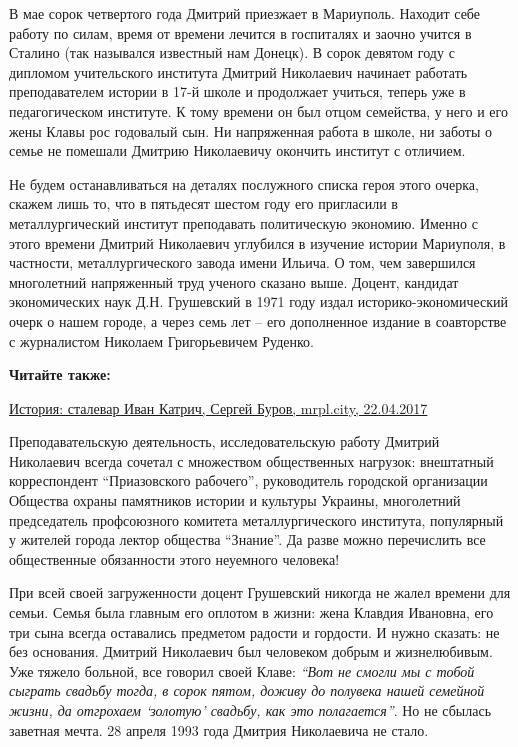 В мае сорок четвертого года Дмитрий приезжает в Мариуполь. Находит себе работу
по силам, время от времени лечится в госпиталях и заочно учится в Сталино (так
назывался известный нам Донецк). В сорок девятом году с дипломом учительского
института Дмитрий Николаевич начинает работать преподавателем истории в 17-й
школе и продолжает учиться, теперь уже в педагогическом институте. К тому
времени он был отцом семейства, у него и его жены Клавы рос годовалый сын. Ни
напряженная работа в школе, ни заботы о семье не помешали Дмитрию Николаевичу
окончить институт с отличием.

Не будем останавливаться на деталях послужного списка героя этого очерка,
скажем лишь то, что в пятьдесят шестом году его пригласили в металлургический
институт преподавать политическую экономию. Именно с этого времени Дмитрий
Николаевич углубился в изучение истории Мариуполя, в частности,
металлургического завода имени Ильича. О том, чем завершился многолетний
напряженный труд ученого сказано выше. Доцент, кандидат экономических наук Д.Н.
Грушевский в 1971 году издал историко-экономический очерк о нашем городе, а
через семь лет – его дополненное издание в соавторстве с журналистом Николаем
Григорьевичем Руденко.

\textbf{Читайте также:} 

\href{https://archive.org/details/22_04_2017.sergij_burov.mrpl_city.istoria_stalevar_ivan_katrich}{%
История: сталевар Иван Катрич, Сергей Буров, mrpl.city, 22.04.2017}

Преподавательскую деятельность, исследовательскую работу Дмитрий Николаевич
всегда сочетал с множеством общественных нагрузок: внештатный корреспондент
\enquote{Приазовского рабочего}, руководитель городской организации Общества охраны
памятников истории и культуры Украины, многолетний председатель профсоюзного
комитета металлургического института, популярный у жителей города лектор
общества \enquote{Знание}. Да разве можно перечислить все общественные обязанности
этого неуемного человека!

При всей своей загруженности доцент Грушевский никогда не жалел времени для
семьи. Семья была главным его оплотом в жизни: жена Клавдия Ивановна, его три
сына всегда оставались предметом радости и гордости. И нужно сказать: не без
основания. Дмитрий Николаевич был человеком добрым и жизнелюбивым. Уже тяжело
больной, все говорил своей Клаве: \emph{\enquote{Вот не смогли мы с тобой сыграть свадьбу
тогда, в сорок пятом, доживу до полувека нашей семейной жизни, да отгрохаем
\enquote{золотую} свадьбу, как это полагается}}. Но не сбылась заветная мечта. 28 апреля
1993 года Дмитрия Николаевича не стало.
